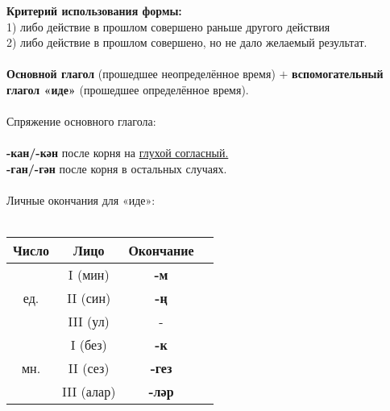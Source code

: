 \textbf{Критерий использования формы:}\\
1) либо действие в прошлом совершено раньше другого действия\\
2) либо действие в прошлом совершено, но не дало желаемый результат.\\\\
\textbf{Основной глагол} (прошедшее неопределённое время) $+$ \textbf{вспомогательный глагол «иде»} (прошедшее определённое время).\\ \\
Спряжение основного глагола:\\\\
\textbf{-кан/-кән} после корня на \underline{глухой согласный.}\\
\textbf{-ган/-гән} после корня в остальных случаях.\\\\
Личные окончания для «иде»:\\\\
\begin{tabular}{ |c|c|c|c| } 
\hline
Число & Лицо & Окончание \\
\hline
\multirow{3}{4em}{ед.}
& I (мин) & \textbf{-м} \\  
& II (син) & \textbf{-ң} \\ 
& III (ул) & - \\ 
\hline
\multirow{3}{4em}{мн.}
& I (без) & \textbf{-к} \\  
& II (сез) & \textbf{-гез} \\ 
& III (алар) & \textbf{-ләр} \\ 
\hline
\end{tabular} \\\\